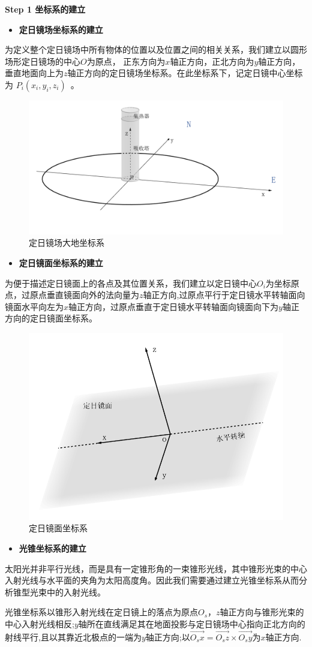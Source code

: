 \documentclass[../main.tex]{subfiles}
\begin{document}
\noindent \textbf{Step 1 坐标系的建立}

\begin{itemize}
\item \textbf{定日镜场坐标系的建立}
\end{itemize}

\par 为定义整个定日镜场中所有物体的位置以及位置之间的相关关系，我们建立以圆形场形定日镜场的中心$O$为原点，  
正东方向为$x$轴正方向，正北方向为$y$轴正方向，垂直地面向上为$z$轴正方向的定日镜场坐标系。在此坐标系下，记定日镜中心坐标为 \( P_i(x_i, y_i, z_i) \) 。 
  \begin{figure}[H]
    \centering
    \includegraphics[width=.6\textwidth]{1}
    \caption{定日镜场大地坐标系}
    \label{1.1}
\end{figure}
    \begin{itemize}
  \item \textbf{定日镜面坐标系的建立}
  \end{itemize}
\par 为便于描述定日镜面上的各点及其位置关系，我们建立以定日镜中心$O_i$为坐标原点，过原点垂直镜面向外的法向量为$z$轴正方向,过原点平行于定日镜水平转轴面向镜面水平向左为$x$轴正方向，过原点垂直于定日镜水平转轴面向镜面向下为$y$轴正方向的定日镜面坐标系。
\begin{figure}[H]
\centering
\includegraphics[width=.6\textwidth]{2}
\caption{定日镜面坐标系}
\label{1.2}
\end{figure}
\begin{itemize}
\item \textbf{光锥坐标系的建立}
\end{itemize}
\par 太阳光并非平行光线，而是具有一定锥形角的一束锥形光线，其中锥形光束的中心入射光线与水平面的夹角为太阳高度角。因此我们需要通过建立光锥坐标系从而分析锥型光束中的入射光线。
\par 光锥坐标系以锥形入射光线在定日镜上的落点为原点$O_s$，$z$轴正方向与锥形光束的中心入射光线相反;$y$轴所在直线满足其在地面投影与定日镜场中心指向正北方向的射线平行,且以其靠近北极点的一端为$y$轴正方向;以\( \overrightarrow{O_sx}=\overrightarrow{O_sz}\times \overrightarrow{O_sy}\)为$x$轴正方向. 
\end{document}
